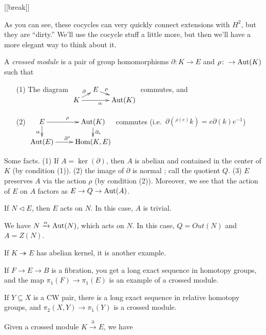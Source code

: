 [[break]]

As you can see, these cocycles can very quickly connect extensions with $H^2$, but they are ``dirty.'' We'll use the cocycle stuff a little more, but then we'll have a more elegant way to think about it.

\begin{definition}
 A \emph{crossed module} is a pair of group homomorphisms $\partial\colon K\to E$ and $\rho\colon \to \operatorname{Aut}(K)$ such that
 \begin{itemize}
  \item[(1)] The diagram $\xymatrix @R-2pc @C-1pc{
   & E\ar[dr]^-\rho \\
   K\ar[ur]^\partial \ar[rr]_\alpha & & \Aut(K)
  }$ commutes, and
  \item[(2)] $\xymatrix@R-1pc{E \ar[r]^\rho \ar[d]_\alpha & \Aut(K) \ar[d]^{\partial_*}\\ \Aut(E) \ar[r]^{\partial^*} & \hom(K,E)}$ commutes (i.e.~$\partial({}^{\rho(e)}k)=e\partial(k) e^{-1}$)
 \end{itemize}
\end{definition}
Some facts. (1) If $A=\ker(\partial)$, then $A$ is abelian and contained in the center of $K$ (by condition (1)). (2) the image of $\partial$ is normal ; call the quotient $Q$. (3) $E$ preserves $A$ via the action $\rho$ (by condition (2)). Moreover, we see that the action of $E$ on $A$ factors as $E\to Q\to \operatorname{Aut}(A)$.
\begin{example}
 If $N\triangleleft E$, then $E$ acts on $N$. In this case, $A$ is trivial.
\end{example}
\begin{example}
 We have $N\xrightarrow{\alpha} \operatorname{Aut}(N)$, which acts on $N$. In this case, $Q=Out(N)$ and $A=Z(N)$.
\end{example}
\begin{example}
 If $K\twoheadrightarrow E$ has abelian kernel, it is another example.
\end{example}
\begin{example}
 If $F\to E\to B$ is a fibration, you get a long exact sequence in homotopy groups, and the map $\pi_1(F)\to \pi_1(E)$ is an example of a crossed module.
\end{example}
\begin{example}
 If $Y\subseteq X$ is a CW pair, there is a long exact sequence in relative homotopy groups, and $\pi_2(X,Y)\to \pi_1(Y)$ is a crossed module.
\end{example}
Given a crossed module $K\xrightarrow\partial E$, we have
